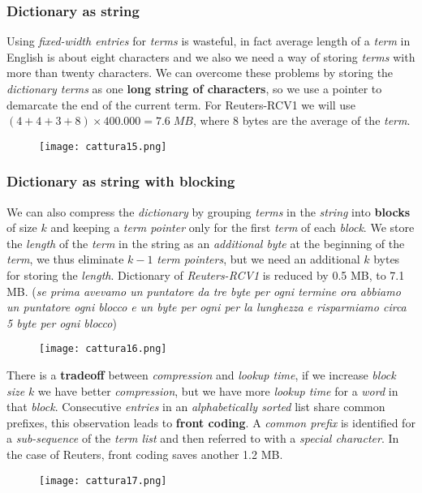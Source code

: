 \documentclass{article}
\begin{document}
\subsubsection{Dictionary as string}
Using \emph{fixed-width entries} for \emph{terms} is wasteful, in fact average length of a \emph{term} in English is about eight characters and we also we need a way of storing \emph{terms} with more than twenty characters. We can overcome these problems by storing the \emph{dictionary terms} as one \textbf{long string of characters}, so we use a pointer to demarcate the end of the current term. For Reuters-RCV1 we will use $(4+4+3+8) \times 400.000 = 7.6\; MB$, where 8 bytes are the average of the \emph{term}. 
\begin{figure}[H]
  \centering
  \texttt{[image: cattura15.png]}
\end{figure}
\subsubsection{Dictionary as string with blocking}
We can also compress the \emph{dictionary} by grouping \emph{terms} in the \emph{string} into \textbf{blocks} of size $k$ and keeping a \emph{term pointer} only for the first \emph{term} of each \emph{block}. We store the \emph{length} of the \emph{term} in the string as an \emph{additional byte} at the beginning of the \emph{term}, we thus eliminate $k-1$ \emph{term pointers}, but we need an additional $k$ bytes for storing the \emph{length}. Dictionary of\emph{ Reuters-RCV1} is reduced by 0.5 MB, to 7.1 MB. (\emph{se prima avevamo un puntatore da tre byte per ogni termine ora abbiamo un puntatore ogni blocco e un byte per ogni per la lunghezza e risparmiamo circa 5 byte per ogni blocco})
\begin{figure}[H]
  \centering
  \texttt{[image: cattura16.png]}
\end{figure}
There is a \textbf{tradeoff} between \emph{compression} and \emph{lookup time}, if we increase \emph{block size} $k$ we have better \emph{compression}, but we have more \emph{lookup time} for a \emph{word} in that \emph{block}. Consecutive \emph{entries} in an \emph{alphabetically sorted} list share common prefixes, this observation leads to \textbf{front coding}. A \emph{common prefix} is identified for a \emph{sub-sequence} of the \emph{term list} and then referred to with a \emph{special character}. In the case of Reuters, front coding saves another 1.2 MB.
\begin{figure}[H]
  \centering
  \texttt{[image: cattura17.png]}
\end{figure}
\end{document}
